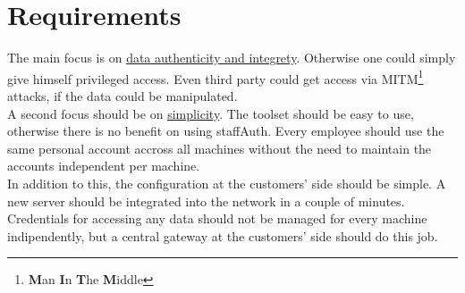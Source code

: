 %
%
%
%
%
%
%


\section{Requirements}

The main focus is on \ul{data authenticity and integrety}. Otherwise one could
simply give himself privileged access. Even third party could get access via
MITM\footnote{\textbf{M}an \textbf{I}n \textbf{T}he \textbf{M}iddle} attacks, if
the data could be manipulated. \\

A second focus should be on \ul{simplicity}. The toolset should be easy to use,
otherwise there is no benefit on using staffAuth. Every employee should use the
same personal account accross all machines without the need to maintain the
accounts independent per machine. \\

In addition to this, the configuration at the customers' side should be simple.
A new server should be integrated into the network in a couple of minutes.
Credentials for accessing any data should not be managed for every machine
indipendently, but a central gateway at the customers' side should do this job.
